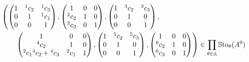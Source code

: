 \begin{align*}
  &\left(
    \begin{pmatrix} 1 & {}^1c_2 & {}^1c_3 \\0 & 1 & {}^1c_1 \\0 & 0 & 1 \end{pmatrix},
    \begin{pmatrix} 1 & 0 & 0 \\{}^2c_2 & 1 & 0 \\{}^2c_3 & 0 & 1 \end{pmatrix},
    \begin{pmatrix} 1 & {}^3c_2 & {}^3c_3 \\0 & 1 & 0 \\0 & 0 & 1 \end{pmatrix},
  \right.
\\&\qquad
  \left.
    \begin{pmatrix} 1 & 0 & 0 \\{}^4c_2 & 1 & 0 \\{}^2c_1{}^4c_2+{}^4c_3 & {}^2c_1 & 1 \end{pmatrix},
    \begin{pmatrix} 1 & {}^5c_2 & {}^5c_3 \\0 & 1 & 0 \\0 & 0 & 1 \end{pmatrix},
    \begin{pmatrix} 1 & 0 & 0 \\{}^{6}c_2 & 1 & 0 \\{}^{6}c_3 & 0 & 1 \end{pmatrix}
  \right)
  \in
  \prod_{\theta\in\mathbb{A}}\operatorname{\mathbb{S}to}_{\theta}(A^0)
\end{align*}

